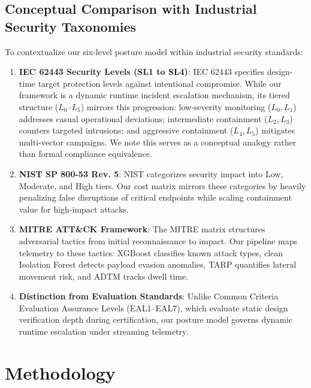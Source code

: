 \documentclass[journal,10pt,onecolumn]{IEEEtran}
\begin{document}
\subsection{Conceptual Comparison with Industrial Security Taxonomies}
To contextualize our six-level posture model within industrial security standards:
\begin{enumerate}
    \item \textbf{IEC 62443 Security Levels (SL1 to SL4)}: IEC 62443 specifies design-time target protection levels against intentional compromise. While our framework is a dynamic runtime incident escalation mechanism, its tiered structure ($L_0$--$L_5$) mirrors this progression: low-severity monitoring ($L_0, L_1$) addresses casual operational deviations; intermediate containment ($L_2, L_3$) counters targeted intrusions; and aggressive containment ($L_4, L_5$) mitigates multi-vector campaigns. We note this serves as a conceptual analogy rather than formal compliance equivalence.
    \item \textbf{NIST SP 800-53 Rev. 5}: NIST categorizes security impact into Low, Moderate, and High tiers. Our cost matrix mirrors these categories by heavily penalizing false disruptions of critical endpoints while scaling containment value for high-impact attacks.
    \item \textbf{MITRE ATT\&CK Framework}: The MITRE matrix structures adversarial tactics from initial reconnaissance to impact. Our pipeline maps telemetry to these tactics: XGBoost classifies known attack types, clean Isolation Forest detects payload evasion anomalies, TARP quantifies lateral movement risk, and ADTM tracks dwell time.
    \item \textbf{Distinction from Evaluation Standards}: Unlike Common Criteria Evaluation Assurance Levels (EAL1--EAL7), which evaluate static design verification depth during certification, our posture model governs dynamic runtime escalation under streaming telemetry.
\end{enumerate}

\section{Methodology}\label{sec:method}
\end{document}
